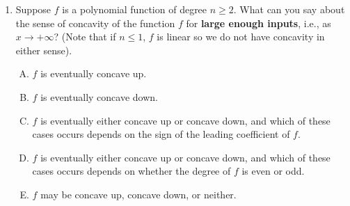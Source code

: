 \documentclass[10pt]{amsart}
\begin{document}
\begin{enumerate}
  {\em Answer}: Option (C)

  {\em Explanation}: $p$ has degree $n + 1$, since it is the product
  of $n + 1$ linear polynomials. Thus, $p''$ has degree $n - 1$, and
  hence can have at most $n - 1$ roots. Thus, the number of points of
  inflection of $p$ is at most $n - 1$. If we can locate $n -1$ points
  of inflection, we will be done.

  Note that since $p$ has zeros at $0,1,2,\dots,n$. By the extreme
  value theorem, there exists a local extreme value for $p$ between
  any two consecutive zeros, and this gives a root of $p'$. By degree
  considerations, there must be exactly one root in each interval $(i
  - 1,i)$. There are thus $n$ distinct roots of $p'$, each giving a
  local extreme value of $p$, located in the intervals $(0,1), (1,2),
  \dots, (n - 1,n)$. Call these roots $a_1, a_2, \dots, a_n$. Then
  $a_1 < a_2 < \dots < a_n$. Applying the extreme value theorem again
  on the intervals $[a_{i-1},a_i]$, we see that there is at least one
  local extremum for $p'$, and hence a zero for $p''$, in that
  interval. Since $p''$ has degree $n - 1$, there must be exactly one
  local extremum on each interval. Since local extrema of the
  derivative correspond to points of inflection, we have found $n - 1$
  distinct points of inflection, and we are done.

  {\em Performance review}: $6$ out of $12$ got this correct. $3$ each
  chose (B) and (E).

  {\em Historical note (last year)}: $7$ out of $15$ people got this
  correct. Other choices were (B) (3), (D) (3), (A) (1), and (E) (1).
  Those people who chose (D) typically made the error of doing $(n +
  1) - 1$ instead of $(n + 1) - 2$.
\item Suppose $f$ is a polynomial function of degree $n \ge 2$. What
  can you say about the sense of concavity of the function $f$ for
  {\bf large enough inputs}, i.e., as $x \to +\infty$? (Note that if
  $n \le 1$, $f$ is linear so we do not have concavity in either
  sense).

  \begin{enumerate}[(A)]
  \item $f$ is eventually concave up.
  \item $f$ is eventually concave down.
  \item $f$ is eventually either concave up or concave down, and which
    of these cases occurs depends on the sign of the leading
    coefficient of $f$.
  \item $f$ is eventually either concave up or concave down, and which
    of these cases occurs depends on whether the degree of $f$ is even
    or odd.
  \item $f$ may be concave up, concave down, or neither.
  \end{enumerate}


\end{enumerate}
\end{document}

